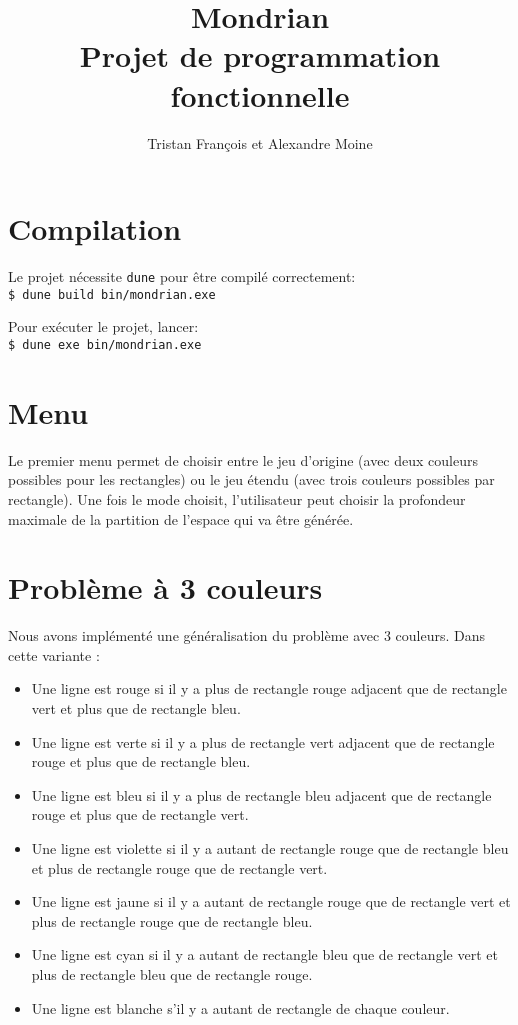 \documentclass[10pt,a4paper]{article}
\begin{document}
	\title{Mondrian \\
			\large Projet de programmation fonctionnelle}
	
	\author{Tristan François et Alexandre Moine}
	\maketitle
	
\section{Compilation}
Le projet nécessite \verb|dune| pour être compilé correctement:\\
\verb|$ dune build bin/mondrian.exe|

Pour exécuter le projet, lancer:\\
\verb|$ dune exe bin/mondrian.exe|

\section{Menu}
Le premier menu permet de choisir entre le jeu d'origine (avec deux couleurs possibles pour les rectangles) ou le jeu étendu (avec trois couleurs possibles par rectangle).
Une fois le mode choisit, l'utilisateur peut choisir la profondeur maximale de la partition de l'espace qui va être générée.

\section{Problème à 3 couleurs}

Nous avons implémenté une généralisation du problème avec 3 couleurs. Dans cette variante :
\begin{itemize}
	\item Une ligne est rouge si il y a plus de rectangle rouge adjacent que de rectangle vert et plus que de rectangle bleu.
	\item Une ligne est verte si il y a plus de rectangle vert adjacent que de rectangle rouge et plus que de rectangle bleu.
	\item Une ligne est bleu si il y a plus de rectangle bleu adjacent que de rectangle rouge et plus que de rectangle vert.
	\item Une ligne est violette si il y a autant de rectangle rouge que de rectangle bleu et plus de rectangle rouge que de rectangle vert.
	\item Une ligne est jaune si il y a autant de rectangle rouge que de rectangle vert et plus de rectangle rouge que de rectangle bleu.
	\item Une ligne est cyan si il y a autant de rectangle bleu que de rectangle vert et plus de rectangle bleu que de rectangle rouge.
	\item Une ligne est blanche s'il y a autant de rectangle de chaque couleur.
\end{itemize}
	
\end{document}
